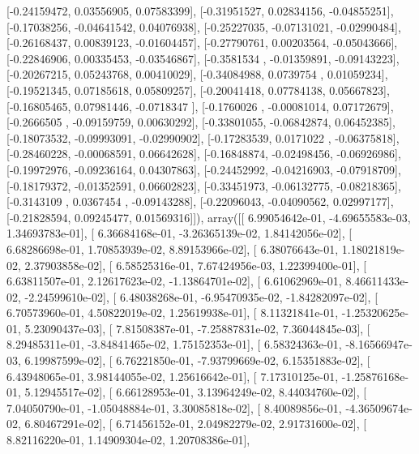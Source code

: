\documentclass{article}
\begin{document}
       [-0.24159472,  0.03556905,  0.07583399],
       [-0.31951527,  0.02834156, -0.04855251],
       [-0.17038256, -0.04641542,  0.04076938],
       [-0.25227035, -0.07131021, -0.02990484],
       [-0.26168437,  0.00839123, -0.01604457],
       [-0.27790761,  0.00203564, -0.05043666],
       [-0.22846906,  0.00335453, -0.03546867],
       [-0.3581534 , -0.01359891, -0.09143223],
       [-0.20267215,  0.05243768,  0.00410029],
       [-0.34084988,  0.0739754 ,  0.01059234],
       [-0.19521345,  0.07185618,  0.05809257],
       [-0.20041418,  0.07784138,  0.05667823],
       [-0.16805465,  0.07981446, -0.0718347 ],
       [-0.1760026 , -0.00081014,  0.07172679],
       [-0.2666505 , -0.09159759,  0.00630292],
       [-0.33801055, -0.06842874,  0.06452385],
       [-0.18073532, -0.09993091, -0.02990902],
       [-0.17283539,  0.0171022 , -0.06375818],
       [-0.28460228, -0.00068591,  0.06642628],
       [-0.16848874, -0.02498456, -0.06926986],
       [-0.19972976, -0.09236164,  0.04307863],
       [-0.24452992, -0.04216903, -0.07918709],
       [-0.18179372, -0.01352591,  0.06602823],
       [-0.33451973, -0.06132775, -0.08218365],
       [-0.3143109 ,  0.0367454 , -0.09143288],
       [-0.22096043, -0.04090562,  0.02997177],
       [-0.21828594,  0.09245477,  0.01569316]]), array([[  6.99054642e-01,  -4.69655583e-03,   1.34693783e-01],
       [  6.36684168e-01,  -3.26365139e-02,   1.84142056e-02],
       [  6.68286698e-01,   1.70853939e-02,   8.89153966e-02],
       [  6.38076643e-01,   1.18021819e-02,   2.37903858e-02],
       [  6.58525316e-01,   7.67424956e-03,   1.22399400e-01],
       [  6.63811507e-01,   2.12617623e-02,  -1.13864701e-02],
       [  6.61062969e-01,   8.46611433e-02,  -2.24599610e-02],
       [  6.48038268e-01,  -6.95470935e-02,  -1.84282097e-02],
       [  6.70573960e-01,   4.50822019e-02,   1.25619938e-01],
       [  8.11321841e-01,  -1.25320625e-01,   5.23090437e-03],
       [  7.81508387e-01,  -7.25887831e-02,   7.36044845e-03],
       [  8.29485311e-01,  -3.84841465e-02,   1.75152353e-01],
       [  6.58324363e-01,  -8.16566947e-03,   6.19987599e-02],
       [  6.76221850e-01,  -7.93799669e-02,   6.15351883e-02],
       [  6.43948065e-01,   3.98144055e-02,   1.25616642e-01],
       [  7.17310125e-01,  -1.25876168e-01,   5.12945517e-02],
       [  6.66128953e-01,   3.13964249e-02,   8.44034760e-02],
       [  7.04050790e-01,  -1.05048884e-01,   3.30085818e-02],
       [  8.40089856e-01,  -4.36509674e-02,   6.80467291e-02],
       [  6.71456152e-01,   2.04982279e-02,   2.91731600e-02],
       [  8.82116220e-01,   1.14909304e-02,   1.20708386e-01],
\end{document}
